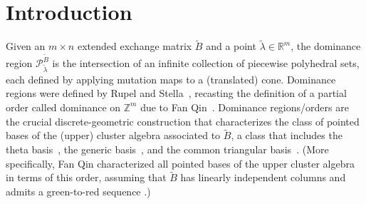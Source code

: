 \documentclass[10pt]{article}
\theoremstyle{definition}
\theoremstyle{remark}
\numberwithin{equation}{section}
\newcommand{\integers}{\mathbb Z}
\newcommand{\reals}{\mathbb R}
\newcommand{\0}{{\mathbf{0}}}
\newcommand{\tB}{{\widetilde{B}}}
\renewcommand{\P}{\mathcal{P}}
\begin{document}
\section{Introduction}  
Given an $m\times n$ extended exchange matrix $\tB$ and a point $\tilde\lambda\in\reals^m$, the dominance region $\P_{\tilde\lambda}^\tB$ is the intersection of an infinite collection of piecewise polyhedral sets, each defined by applying mutation maps to a (translated) cone.
Dominance regions were defined by Rupel and Stella~\cite{RSDom}, recasting the definition of a partial order called dominance on $\integers^m$ due to Fan Qin~\cite{FanQin}.
Dominance regions/orders are the crucial discrete-geometric construction that characterizes the class of pointed bases of the (upper) cluster algebra associated to $\tB$, a class that includes the theta basis~\cite{GHKK}, the generic basis~\cite{Dup11}, and the common triangular basis~\cite{QinTri}. 
(More specifically, Fan Qin characterized all pointed bases of the upper cluster algebra in terms of this order, assuming that $\tB$ has linearly independent columns and admits a green-to-red sequence \cite[Theorem~1.2.1]{FanQin}.)
\end{document}
